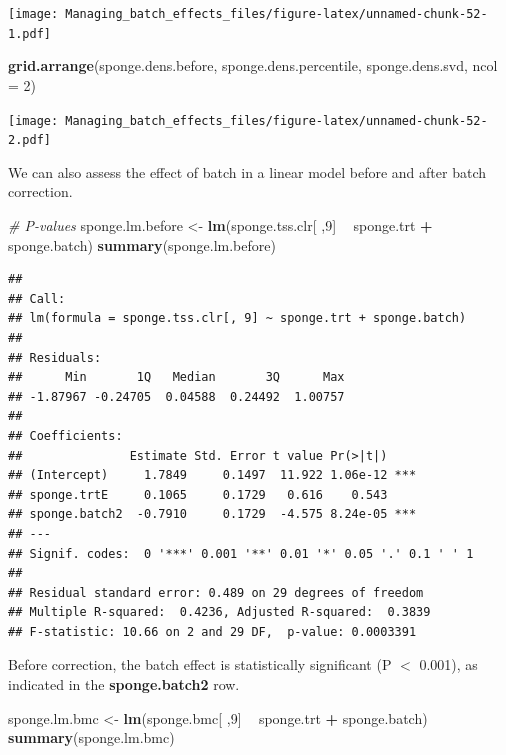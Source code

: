 \documentclass[]{book}
\newenvironment{Shaded}{\begin{snugshade}}{\end{snugshade}}
\newcommand{\KeywordTok}[1]{\textcolor[rgb]{0.13,0.29,0.53}{\textbf{#1}}}
\newcommand{\DataTypeTok}[1]{\textcolor[rgb]{0.13,0.29,0.53}{#1}}
\newcommand{\DecValTok}[1]{\textcolor[rgb]{0.00,0.00,0.81}{#1}}
\newcommand{\StringTok}[1]{\textcolor[rgb]{0.31,0.60,0.02}{#1}}
\newcommand{\CommentTok}[1]{\textcolor[rgb]{0.56,0.35,0.01}{\textit{#1}}}
\newcommand{\OperatorTok}[1]{\textcolor[rgb]{0.81,0.36,0.00}{\textbf{#1}}}
\newcommand{\NormalTok}[1]{#1}
\begin{document}
\texttt{[image: Managing\_batch\_effects\_files/figure-latex/unnamed-chunk-52-1.pdf]}

\begin{Shaded}
\begin{Highlighting}[]
\KeywordTok{grid.arrange}\NormalTok{(sponge.dens.before, sponge.dens.percentile, }
\NormalTok{             sponge.dens.svd, }\DataTypeTok{ncol =} \DecValTok{2}\NormalTok{)}
\end{Highlighting}
\end{Shaded}

\texttt{[image: Managing\_batch\_effects\_files/figure-latex/unnamed-chunk-52-2.pdf]}

We can also assess the effect of batch in a linear model before and
after batch correction.

\begin{Shaded}
\begin{Highlighting}[]
\CommentTok{# P-values}
\NormalTok{sponge.lm.before <-}\StringTok{ }\KeywordTok{lm}\NormalTok{(sponge.tss.clr[ ,}\DecValTok{9}\NormalTok{] }\OperatorTok{~}\StringTok{ }\NormalTok{sponge.trt }\OperatorTok{+}\StringTok{ }\NormalTok{sponge.batch)}
\KeywordTok{summary}\NormalTok{(sponge.lm.before)}
\end{Highlighting}
\end{Shaded}

\begin{verbatim}
## 
## Call:
## lm(formula = sponge.tss.clr[, 9] ~ sponge.trt + sponge.batch)
## 
## Residuals:
##      Min       1Q   Median       3Q      Max 
## -1.87967 -0.24705  0.04588  0.24492  1.00757 
## 
## Coefficients:
##               Estimate Std. Error t value Pr(>|t|)    
## (Intercept)     1.7849     0.1497  11.922 1.06e-12 ***
## sponge.trtE     0.1065     0.1729   0.616    0.543    
## sponge.batch2  -0.7910     0.1729  -4.575 8.24e-05 ***
## ---
## Signif. codes:  0 '***' 0.001 '**' 0.01 '*' 0.05 '.' 0.1 ' ' 1
## 
## Residual standard error: 0.489 on 29 degrees of freedom
## Multiple R-squared:  0.4236, Adjusted R-squared:  0.3839 
## F-statistic: 10.66 on 2 and 29 DF,  p-value: 0.0003391
\end{verbatim}

Before correction, the batch effect is statistically significant (P
\(<\) 0.001), as indicated in the \textbf{sponge.batch2} row.

\begin{Shaded}
\begin{Highlighting}[]
\NormalTok{sponge.lm.bmc <-}\StringTok{ }\KeywordTok{lm}\NormalTok{(sponge.bmc[ ,}\DecValTok{9}\NormalTok{] }\OperatorTok{~}\StringTok{ }\NormalTok{sponge.trt }\OperatorTok{+}\StringTok{ }\NormalTok{sponge.batch)}
\KeywordTok{summary}\NormalTok{(sponge.lm.bmc)}
\end{Highlighting}
\end{Shaded}
\end{document}
